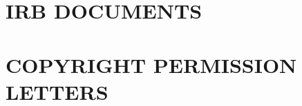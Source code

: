 \documentclass{UCF_ETD}
\begin{document}


\appendix

\chapter{IRB DOCUMENTS}
\newpage




\chapter{COPYRIGHT PERMISSION LETTERS}
\newpage


\backmatter
\end{document}
